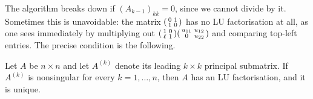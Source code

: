 \documentclass[a4paper]{scrartcl}
\begin{document}
The algorithm breaks down if $(A_{k-1})_{kk} = 0$, since we cannot divide by it. Sometimes this is unavoidable: the matrix $\begin{psmallmatrix}0&1\\1&0\end{psmallmatrix}$ has no LU factorisation at all, as one sees immediately by multiplying out $\begin{psmallmatrix}1&0\\ \ell&1\end{psmallmatrix}\begin{psmallmatrix}u_{11}&u_{12}\\0&u_{22}\end{psmallmatrix}$ and comparing top-left entries. The precise condition is the following.

\begin{theorem}\label{thm:luexist}
  Let $A$ be $n\times n$ and let $A^{(k)}$ denote its leading $k\times k$ principal submatrix. If $A^{(k)}$ is nonsingular for every $k = 1, \dots, n$, then $A$ has an LU factorisation, and it is unique.
\end{theorem}
\end{document}
